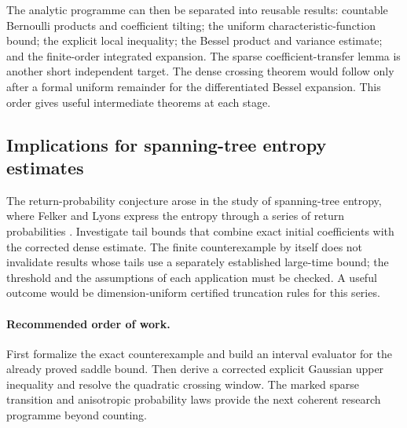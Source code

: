 \documentclass[11pt,letterpaper]{article}
\theoremstyle{remark}\newtheorem{remark}[theorem]{Remark}
\begin{document}
The analytic programme can then be separated into reusable results:
countable Bernoulli products and coefficient tilting; the uniform
characteristic-function bound; the explicit local inequality;
the Bessel product and variance estimate; and the finite-order
integrated expansion. The sparse coefficient-transfer lemma is another
short independent target. The dense crossing theorem would follow
only after a formal uniform remainder for the differentiated Bessel
expansion. This order gives useful intermediate theorems at each stage.

\subsection{Implications for spanning-tree entropy estimates}

The return-probability conjecture arose in the study of spanning-tree
entropy, where Felker and Lyons express the entropy through a series
of return probabilities \cite{felkerlyons}. Investigate tail bounds
that combine exact initial coefficients with the corrected dense
estimate. The finite counterexample by itself does not invalidate
results whose tails use a separately established large-time bound;
the threshold and the assumptions of each application must be checked.
A useful outcome would be dimension-uniform certified truncation
rules for this series.

\paragraph{Recommended order of work.}
First formalize the exact counterexample and build an interval evaluator
for the already proved saddle bound. Then derive a corrected explicit
Gaussian upper inequality and resolve the quadratic crossing window.
The marked sparse transition and anisotropic probability laws provide
the next coherent research programme beyond counting.
\end{document}
